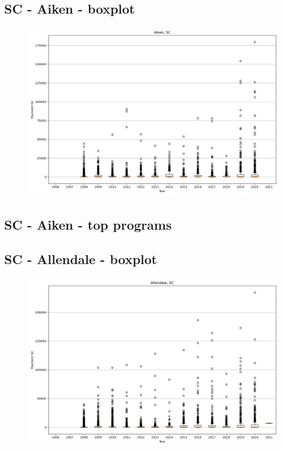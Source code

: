 \subsection*{SC - Aiken - boxplot}
\begin{figure}[h]
\centering
\includegraphics[width=7in]{../output/boxplots/counties/Aiken-SC_boxplot.png}
\end{figure}


\subsection*{SC - Aiken - top programs}

\newpage
\subsection*{SC - Allendale - boxplot}
\begin{figure}[h]
\centering
\includegraphics[width=7in]{../output/boxplots/counties/Allendale-SC_boxplot.png}
\end{figure}


